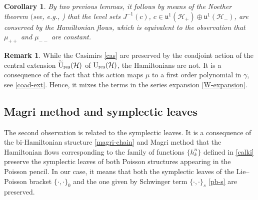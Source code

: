 \documentclass[pdftex]{sigma}
\newtheorem{cor}[thm]{Corollary}
\theoremstyle{definition}
\newtheorem{rem}[thm]{Remark}
\numberwithin{equation}{section}
\renewcommand{\H}{\mathcal{H}}
\newcommand{\Ur}{\mathrm{U}_{\textnormal{res}}(\H)}
\newcommand{\Urt}{\widetilde{\mathrm{U}}_{\textnormal{res}}(\H)}
\newcommand{\uujp}{\mathfrak u^1(\H_+)}\newcommand{\uujm}{\mathfrak u^1(\H_-)}
\newcommand{\pb}{\{\cdot,\cdot\}}
\begin{document}
\begin{cor}
By two previous lemmas, it follows by means of the Noether theorem $($see, e.g., {\rm\cite[\emph{Theorem}~8.2]{OR})} that the level sets $J^{-1}(c)$, $c\in \uujp\oplus \uujm$, are conserved by the Hamiltonian flows, which is equivalent to the observation that $\mu_{++}$ and $\mu_{--}$ are constant.
\end{cor}

\begin{rem}
While the Casimirs \eqref{cas} are preserved by the coadjoint action of the central extension $\Urt$ of $\Ur$, the Hamiltonians are not. It is a consequence of the fact that this action maps $\mu$ to a first order polynomial in $\gamma$, see \eqref{coad-ext}.
Hence, it mixes the terms in the series expansion \eqref{W-expansion}.
\end{rem}

\subsection{Magri method and symplectic leaves}
The second observation is related to the symplectic leaves.
It is a consequence of the bi-Hamiltonian structure \eqref{magri-chain} and Magri method that the Hamiltonian flows corresponding to the family of functions $\{h^n_k\}$ defined in \eqref{calki} preserve the symplectic leaves of both Poisson structures appearing in the Poisson pencil.
In our case, it means that both the symplectic leaves of the Lie--Poisson bracket $\pb_0$ and the one given by Schwinger term $\pb_s$ \eqref{pb-s}
are preserved.
\end{document}

